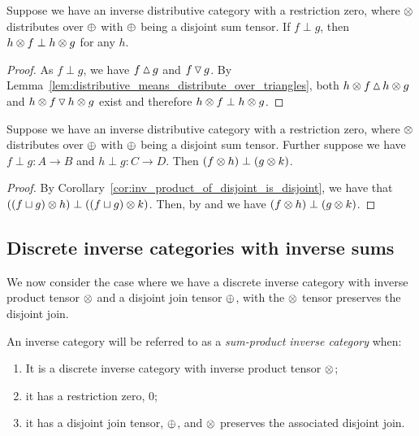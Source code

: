 \begin{corollary}\label{cor:inverse_pdt_preserves_disjointness}
  Suppose we have an inverse distributive category \X with a restriction zero, where $\otimes$
  distributes over $\oplus$ with $\oplus$ being a disjoint sum tensor. If $f \perp g$, then $h\otimes f \perp h\otimes
  g$ for any $h$.
\end{corollary}
\begin{proof}
  As $f\perp g$, we have $f\operatorname{\vartriangle} g$ and $f\operatorname{\triangledown} g$. By
  Lemma~\ref{lem:distributive_means_distribute_over_triangles}, both $h\otimes f \operatorname{\vartriangle} h\otimes g$ and
  $h\otimes f \operatorname{\triangledown} h\otimes g$ exist and therefore $h\otimes f \perp h\otimes g$.
\end{proof}
\begin{corollary}\label{cor:inv_product_of_disjoint_is_disjoint}
  Suppose we have an inverse distributive category \X with a restriction zero, where $\otimes$
  distributes over $\oplus$ with $\oplus$ being a disjoint sum tensor. Further suppose we have
  $f\perp g : A\to B$ and $h \perp g: C\to D$. Then $(f\otimes h)\perp (g\otimes k)$.
\end{corollary}
\begin{proof}
  By Corollary~\ref{cor:inv_product_of_disjoint_is_disjoint}, we have that
  $((f\sqcup g)\otimes h) \perp ((f\sqcup g)\otimes k)$. Then, by  and  we have
  $(f\otimes h)\perp (g\otimes k)$.
\end{proof}

\subsection{Discrete inverse categories with inverse sums} %
\label{sub:discrete_inverse_categories_with_inverse_sums}

We now consider the case where we have a discrete inverse category with inverse product
tensor $\otimes$ and a disjoint join tensor $\oplus$, with the $\otimes$ tensor preserves the
disjoint join.

\begin{definition}\label{def:sum_product_inverse_category}
  An inverse category will be referred to as a \emph{sum-product inverse category} when:
  \begin{enumerate}
    \item It is a discrete inverse category with inverse product tensor $\otimes$;
    \item it has a restriction zero, $0$;
    \item it has a disjoint join tensor, $\oplus$, and $\otimes$ preserves the associated disjoint join.
  \end{enumerate}
\end{definition}

